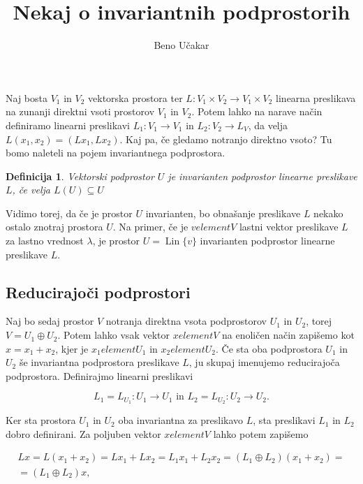 \documentclass[a4paper,12pt]{article}
\title{Nekaj o invariantnih podprostorih}
\author{Beno Učakar}
\date{}
\newtheorem{definition}{Definicija}}
\DeclareMathOperator{\Lin}{Lin}
\begin{document}
\maketitle

Naj bosta $V_1$ in $V_2$ vektorska prostora ter $L \colon V_1 \times V_2 \to V_1 \times V_2$ linearna preslikava na zunanji direktni vsoti prostorov $V_1$ in $V_2$.
Potem lahko na narave način definiramo linearni preslikavi $L_1 \colon V_1 \to V_1$ in $L_2 \colon V_2 \to L_V$, da velja  
\(L(x_1, x_2) = (Lx_1, Lx_2).\)
Kaj pa, če gledamo notranjo direktno vsoto? Tu bomo naleteli na pojem invariantnega podprostora.

    \begin{definition}
        Vektorski podprostor $U$ je invarianten podprostor linearne preslikave $L$, če velja 
        $L(U) \subseteq U$
    \end{definition}

Vidimo torej, da če je prostor $U$ invarianten, bo obnašanje preslikave $L$ nekako ostalo znotraj prostora $U$.
Na primer, če je $v element V$ lastni vektor preslikave $L$ za lastno vrednost $\lambda$, je prostor 
\(U = \Lin \{ v \}\) invarianten podprostor linearne preslikave $L$.

\subsection*{Reducirajoči podprostori}

Naj bo sedaj prostor $V$ notranja direktna vsota podprostorov $U_1$ in $U_2$, torej $V = U_1 \oplus U_2$.
Potem lahko vsak vektor $x element V$ na enoličen način zapišemo kot $x = x_1 + x_2$, kjer je $x_1 element U_1$ in $x_2 element U_2$.
Če sta oba podprostora $U_1$ in $U_2$ še invariantna podprostora preslikave $L$, ju skupaj imenujemo reducirajoča podprostora.
Definirajmo linearni preslikavi 

$$L_1 = L _{U_1} \colon U_1 \to U_1  \text{ in }  L_2 = L _{U_2} \colon U_2 \to U_2.$$

Ker sta prostora $U_1$ in $U_2$ oba invariantna za preslikavo $L$, sta preslikavi $L_1$ in $L_2$ dobro definirani.
Za poljuben vektor $x element V$ lahko potem zapišemo 

\begin{multline}
    Lx = L(x_1 + x_2) = Lx_1+ Lx_2 = L_1x_1 + L_2x_2 = (L_1 \oplus L_2)(x_1 + x_2) = \\
 = (L_1 \oplus L_2)x,
\end{multline}
\end{document}
